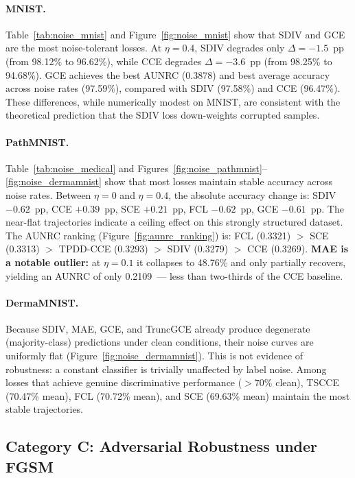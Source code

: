 \paragraph{MNIST.}
Table~\ref{tab:noise_mnist} and Figure~\ref{fig:noise_mnist}
show that SDIV and GCE are the most noise-tolerant losses.
At $\eta{=}0.4$, SDIV degrades only $\Delta{=}{-1.5}$~pp (from 98.12\% to
96.62\%), while CCE degrades $\Delta{=}{-3.6}$~pp (from 98.25\% to 94.68\%).
GCE achieves the best AUNRC (0.3878) and best average accuracy across noise rates
(97.59\%), compared with SDIV (97.58\%) and CCE (96.47\%).
These differences, while numerically modest on MNIST, are consistent with the
theoretical prediction that the SDIV loss down-weights corrupted samples.

\paragraph{PathMNIST.}
Table~\ref{tab:noise_medical} and Figures~\ref{fig:noise_pathmnist}--\ref{fig:noise_dermamnist}
show that most losses maintain stable accuracy across noise rates.
Between $\eta{=}0$ and $\eta{=}0.4$, the absolute accuracy change is:
SDIV $-0.62$~pp, CCE $+0.39$~pp, SCE $+0.21$~pp, FCL $-0.62$~pp, GCE $-0.61$~pp.
The near-flat trajectories indicate a ceiling effect on this strongly structured dataset.
The AUNRC ranking (Figure~\ref{fig:aunrc_ranking}) is:
FCL (0.3321) $>$ SCE (0.3313) $>$ TPDD-CCE (0.3293) $>$ SDIV (0.3279) $>$ CCE (0.3269).
\textbf{MAE is a notable outlier:} at $\eta{=}0.1$ it collapses to 48.76\%
and only partially recovers, yielding an AUNRC of only 0.2109~---
less than two-thirds of the CCE baseline.

\paragraph{DermaMNIST.}
Because SDIV, MAE, GCE, and TruncGCE already produce degenerate
(majority-class) predictions under clean conditions, their noise curves are
uniformly flat (Figure~\ref{fig:noise_dermamnist}).
This is not evidence of robustness: a constant classifier is trivially
unaffected by label noise.
Among losses that achieve genuine discriminative performance ($>70\%$ clean),
TSCCE (70.47\% mean), FCL (70.72\% mean), and SCE (69.63\% mean) maintain
the most stable trajectories.

\subsection{Category C: Adversarial Robustness under FGSM}
\label{sec:fgsm}

